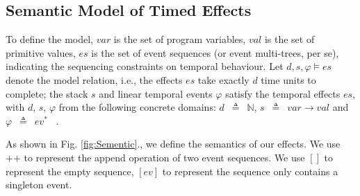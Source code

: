 \documentclass[acmsmall,10pt,review]{acmart}
\newcommand{\code}[1]{{\tt{\ensuremath{\m{#1}}}}}
\newcommand{\m}{\mathit}
\newcommand{\lappend}{\mathrel{\texttt{++}}}
\def\defeq{\ensuremath{\,\triangleq}}
\newcommand\figref[1]{Fig. \textcolor{black}{\ref{#1}}.}
\begin{document}
{\subsection{Semantic Model of Timed Effects}
\label{subsec:Specification_Semantics}


To define the model, 
\code{var} is the set of program variables, 
\code{val} is the set of primitive values, 
\code{es} is the set of event sequences (or event multi-trees, per se), indicating the sequencing constraints on temporal behaviour.
Let \code{d, s, \varphi \models es} denote the model relation, i.e., 
the effects \code{es} take exactly \code{d} time units to complete; 
the stack \code{s} and linear temporal events \code{\varphi} satisfy the 
temporal effects \code{es}, with \code{d}, \code{s}, \code{\varphi} 
from the following concrete domains: \code{d}  {\defeq}\  \code{\mathbb{N}}, 
\code{s}  \defeq\  \code{var {\rightarrow} val } and \code{\varphi}   \defeq\ \code{ev^*} \ .

As shown in \figref{fig:Sementic}, we define the semantics of our effects. 
We use $\lappend$ to represent the append operation of two event sequences. 
We use $[]$ to represent the empty sequence, \code{[ev]} to represent 
the sequence only contains a singleton event. 

}
\end{document}
